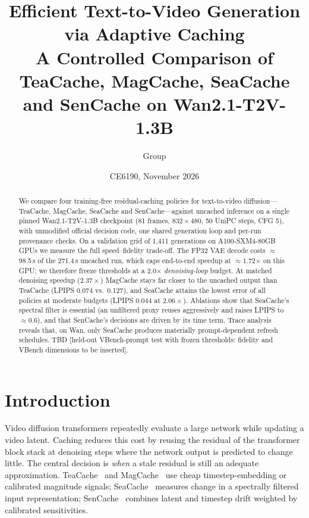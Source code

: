 \documentclass[11pt,a4paper]{article}
\title{Efficient Text-to-Video Generation via Adaptive Caching\\
\large A Controlled Comparison of TeaCache, MagCache, SeaCache and SenCache on Wan2.1-T2V-1.3B}
\author{Group \fillin{XX}\\\fillin{member names and student identifiers}}
\date{CE6190, November 2026}
\newcommand{\pending}{\textcolor{draftorange}{\textsf{TBD}}}
\begin{document}
\maketitle
\thispagestyle{fancy}

\begin{abstract}\sloppy
We compare four training-free residual-caching policies for text-to-video diffusion---TeaCache, MagCache, SeaCache and
SenCache---against uncached inference on a single pinned Wan2.1-T2V-1.3B checkpoint (81 frames, $832\times480$, 50 UniPC
steps, CFG 5), with unmodified official decision code, one shared generation loop and per-run provenance checks. On a
validation grid of 1{,}411 generations on A100-SXM4-80GB GPUs we measure the full speed--fidelity trade-off. The FP32 VAE
decode costs $\approx$98.5\,s of the 271.4\,s uncached run, which caps end-to-end speedup at $\approx$1.72$\times$ on this
GPU; we therefore freeze thresholds at a 2.0$\times$ \emph{denoising-loop} budget. At matched denoising speedup
($2.37\times$) MagCache stays far closer to the uncached output than TeaCache (LPIPS 0.074 vs.\ 0.127), and SeaCache
attains the lowest error of all policies at moderate budgets (LPIPS 0.044 at $2.06\times$). Ablations show that
SeaCache's spectral filter is essential (an unfiltered proxy reuses aggressively and raises LPIPS to $\approx$0.6), and that
SenCache's decisions are driven by its time term. Trace analysis reveals that, on Wan, only SeaCache produces materially
prompt-dependent refresh schedules. \pending{} [held-out VBench-prompt test with frozen thresholds: fidelity and VBench
dimensions to be inserted].
\end{abstract}

\section{Introduction}
Video diffusion transformers repeatedly evaluate a large network while updating a video latent. Caching reduces this cost by
reusing the residual of the transformer block stack at denoising steps where the network output is predicted to change
little. The central decision is \emph{when} a stale residual is still an adequate approximation. TeaCache~\citep{liu2025teacache}
and MagCache~\citep{ma2025magcache} use cheap timestep-embedding or calibrated magnitude signals; SeaCache~\citep{chung2026seacache}
measures change in a spectrally filtered input representation; SenCache~\citep{haghighi2026sencache} combines latent and
timestep drift weighted by calibrated sensitivities.
\end{document}
